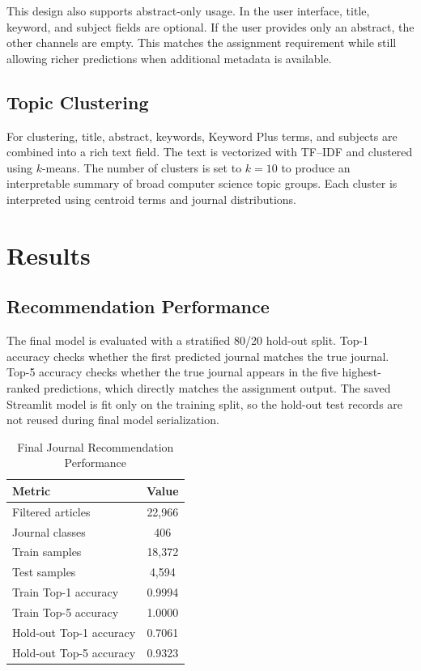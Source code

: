 \documentclass[conference]{IEEEtran}
\begin{document}
This design also supports abstract-only usage. In the user interface, title, keyword, and subject fields are optional. If the user provides only an abstract, the other channels are empty. This matches the assignment requirement while still allowing richer predictions when additional metadata is available.

\subsection{Topic Clustering}
For clustering, title, abstract, keywords, Keyword Plus terms, and subjects are combined into a rich text field. The text is vectorized with TF--IDF and clustered using $k$-means. The number of clusters is set to $k=10$ to produce an interpretable summary of broad computer science topic groups. Each cluster is interpreted using centroid terms and journal distributions.

\section{Results}

\subsection{Recommendation Performance}
The final model is evaluated with a stratified 80/20 hold-out split. Top-1 accuracy checks whether the first predicted journal matches the true journal. Top-5 accuracy checks whether the true journal appears in the five highest-ranked predictions, which directly matches the assignment output. The saved Streamlit model is fit only on the training split, so the hold-out test records are not reused during final model serialization.

\begin{table}[htbp]
\centering
\caption{Final Journal Recommendation Performance}
\label{tab:performance}
\begin{tabular}{lc}
\toprule
Metric & Value \\
\midrule
Filtered articles & 22,966 \\
Journal classes & 406 \\
Train samples & 18,372 \\
Test samples & 4,594 \\
Train Top-1 accuracy & 0.9994 \\
Train Top-5 accuracy & 1.0000 \\
Hold-out Top-1 accuracy & 0.7061 \\
Hold-out Top-5 accuracy & 0.9323 \\
\bottomrule
\end{tabular}
\end{table}
\end{document}
